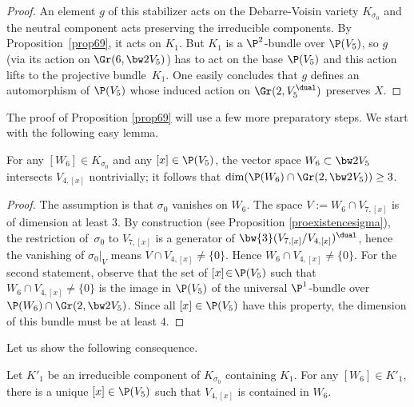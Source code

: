 \begin{proof}
An element $g$ of this stabilizer acts on the Debarre-Voisin variety
$K_{\sigma_0}$ and the neutral component acts preserving the irreducible components. By Proposition~\ref{prop69}, it acts on $K_1$. But
$K_1$ is a $\P^2$-bundle over $\P(V_5)$, so $g$ (via its action
on $\Gr(6,\bw2V_5)$) has to act on
the base $\P(V_5)$ and this action lifts to the projective bundle~$K_1$.
One easily concludes that $g$ defines an automorphism of $\P(V_5)$ whose induced action on $\Gr(2,V_5^\dual)$
preserves $X$.
\end{proof}

The proof of Proposition \ref{prop69} will use a few more preparatory steps.
We start with the
following easy lemma.

\begin{lemm}\label{lepourV6dansKsigma0}
For any $[W_6]\in K_{\sigma_0}$ and any
$[x]\in \P(V_5)$,
the vector space $W_6\subset \bw2V_5$ intersects $V_{4,[x]}$ nontrivially; it follows that $\dim (\P(W_6)\cap \Gr(2, \bw2V_5))\geq 3$.
\end{lemm}

\begin{proof} The assumption is that $\sigma_0$ vanishes on $W_6$. The space
$V:=W_{6}\cap V_{7,[x]}$ is of dimension at least $3$. By construction
(see Proposition \ref{proexistencesigma}), the restriction of~$\sigma_0$ to
$V_{7,[x]}$ is a generator of $\bw{3}(V_{7,[x]}/V_{4,[x]})^\dual$, hence the vanishing of
$\sigma_0\vert_{V}$ means \hbox{$V\cap V_{4,[x]}\ne \{0\}$}. Hence $W_6\cap V_{4,[x]}\ne \{0\}$. For the second statement, observe that the set of
$[x]\!\in\!\P(V_5)$ such that~\hbox{$W_6\!\cap\!V_{4,[x]}\!\ne\!\{0\}$} is the image in
$\P(V_5)$ of the universal $\P^1$-bundle over $\P(W_6)\cap\nobreak \Gr(2, \bw2V_5)$.
Since all $[x]\in \P(V_5)$ have this property, the dimension of this bundle must be at least $4$.
\end{proof}

Let us show the following consequence.

\begin{coro} \label{coropourKsigma01007}
Let $K'_1$ be an irreducible component of $K_{\sigma_0}$ containing $K_1$. For any $[W_6]\in K'_1$, there is
a unique $[x]\in \P(V_5)$ such that $V_{4,[x]} $ is contained in $W_6$.
\end{coro}

